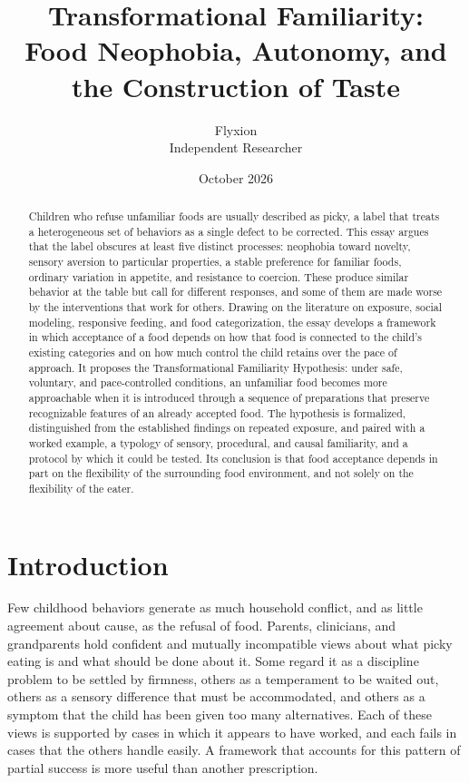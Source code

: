 \documentclass[11pt]{article}
\title{Transformational Familiarity:\\Food Neophobia, Autonomy, and the Construction of Taste}
\author{Flyxion\\\small Independent Researcher}
\date{October 2026}
\theoremstyle{remark}
\begin{document}
\maketitle

\begin{abstract}
\noindent Children who refuse unfamiliar foods are usually described as picky, a label that treats a heterogeneous set of behaviors as a single defect to be corrected. This essay argues that the label obscures at least five distinct processes: neophobia toward novelty, sensory aversion to particular properties, a stable preference for familiar foods, ordinary variation in appetite, and resistance to coercion. These produce similar behavior at the table but call for different responses, and some of them are made worse by the interventions that work for others. Drawing on the literature on exposure, social modeling, responsive feeding, and food categorization, the essay develops a framework in which acceptance of a food depends on how that food is connected to the child's existing categories and on how much control the child retains over the pace of approach. It proposes the Transformational Familiarity Hypothesis: under safe, voluntary, and pace-controlled conditions, an unfamiliar food becomes more approachable when it is introduced through a sequence of preparations that preserve recognizable features of an already accepted food. The hypothesis is formalized, distinguished from the established findings on repeated exposure, and paired with a worked example, a typology of sensory, procedural, and causal familiarity, and a protocol by which it could be tested. Its conclusion is that food acceptance depends in part on the flexibility of the surrounding food environment, and not solely on the flexibility of the eater.
\end{abstract}

\tableofcontents
\newpage

\section{Introduction}\label{sec:intro}

Few childhood behaviors generate as much household conflict, and as little agreement about cause, as the refusal of food. Parents, clinicians, and grandparents hold confident and mutually incompatible views about what picky eating is and what should be done about it. Some regard it as a discipline problem to be settled by firmness, others as a temperament to be waited out, others as a sensory difference that must be accommodated, and others as a symptom that the child has been given too many alternatives. Each of these views is supported by cases in which it appears to have worked, and each fails in cases that the others handle easily. A framework that accounts for this pattern of partial success is more useful than another prescription.
\end{document}
